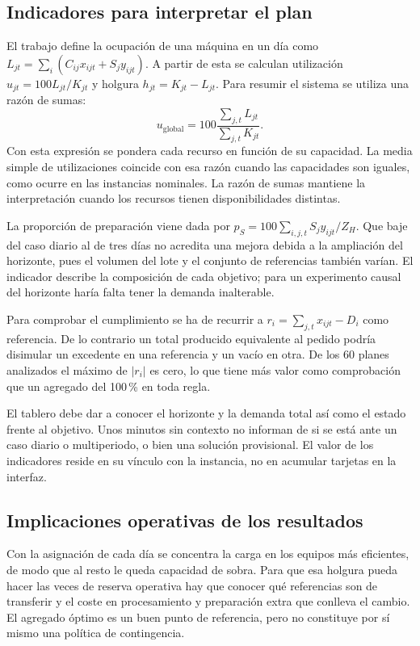 \subsection{Indicadores para interpretar el plan}
El trabajo define la ocupación de una máquina en un día como $L_{jt}=\sum_i(C_{ij}x_{ijt}+S_jy_{ijt})$. A partir de esta se calculan utilización $u_{jt}=100L_{jt}/K_{jt}$ y holgura $h_{jt}=K_{jt}-L_{jt}$. Para resumir el sistema se utiliza una razón de sumas:
\begin{equation}
u_{\mathrm{global}}=100\frac{\sum_{j,t}L_{jt}}{\sum_{j,t}K_{jt}}.
\end{equation}
Con esta expresión se pondera cada recurso en función de su capacidad. La media simple de utilizaciones coincide con esa razón cuando las capacidades son iguales, como ocurre en las instancias nominales. La razón de sumas mantiene la interpretación cuando los recursos tienen disponibilidades distintas.

La proporción de preparación viene dada por $p_S=100\sum_{i,j,t}S_jy_{ijt}/Z_H$. Que baje del caso diario al de tres días no acredita una mejora debida a la ampliación del horizonte, pues el volumen del lote y el conjunto de referencias también varían. El indicador describe la composición de cada objetivo; para un experimento causal del horizonte haría falta tener la demanda inalterable.

Para comprobar el cumplimiento se ha de recurrir a $r_i=\sum_{j,t}x_{ijt}-D_i$ como referencia. De lo contrario un total producido equivalente al pedido podría disimular un excedente en una referencia y un vacío en otra. De los 60 planes analizados el máximo de $|r_i|$ es cero, lo que tiene más valor como comprobación que un agregado del 100\,\% en toda regla.

El tablero debe dar a conocer el horizonte y la demanda total así como el estado frente al objetivo. Unos minutos sin contexto no informan de si se está ante un caso diario o multiperiodo, o bien una solución provisional. El valor de los indicadores reside en su vínculo con la instancia, no en acumular tarjetas en la interfaz.

\subsection{Implicaciones operativas de los resultados}
Con la asignación de cada día se concentra la carga en los equipos más eficientes, de modo que al resto le queda capacidad de sobra. Para que esa holgura pueda hacer las veces de reserva operativa hay que conocer qué referencias son de transferir y el coste en procesamiento y preparación extra que conlleva el cambio. El agregado óptimo es un buen punto de referencia, pero no constituye por sí mismo una política de contingencia.

